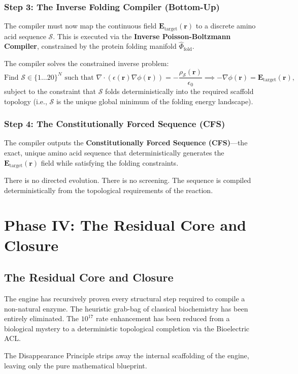 \documentclass[11pt,openany]{extbook}
\theoremstyle{plain}
\theoremstyle{definition}
\begin{document}
\subsubsection{Step 3: The Inverse Folding Compiler (Bottom-Up)}
The compiler must now map the continuous field $\mathbf{E}_{\text{target}}(\mathbf{r})$ to a discrete amino acid sequence $\mathcal{S}$. This is executed via the \textbf{Inverse Poisson-Boltzmann Compiler}, constrained by the protein folding manifold $\hat{\Phi}_{\text{fold}}$.

The compiler solves the constrained inverse problem:
\[
\text{Find } \mathcal{S} \in \{1 \dots 20\}^N \text{ such that } \nabla \cdot (\epsilon(\mathbf{r}) \nabla \phi(\mathbf{r})) = -\frac{\rho_{\mathcal{S}}(\mathbf{r})}{\epsilon_0} \implies -\nabla \phi(\mathbf{r}) = \mathbf{E}_{\text{target}}(\mathbf{r}),
\]
subject to the constraint that $\mathcal{S}$ folds deterministically into the required scaffold topology (i.e., $\mathcal{S}$ is the unique global minimum of the folding energy landscape).

\subsubsection{Step 4: The Constitutionally Forced Sequence (CFS)}
The compiler outputs the \textbf{Constitutionally Forced Sequence (CFS)}---the exact, unique amino acid sequence that deterministically generates the $\mathbf{E}_{\text{target}}(\mathbf{r})$ field while satisfying the folding constraints.

There is no directed evolution. There is no screening. The sequence is compiled deterministically from the topological requirements of the reaction.

\section{Phase IV: The Residual Core and Closure}

\subsection{The Residual Core and Closure}
The engine has recursively proven every structural step required to compile a non-natural enzyme. The heuristic grab-bag of classical biochemistry has been entirely eliminated. The $10^{17}$ rate enhancement has been reduced from a biological mystery to a deterministic topological completion via the Bioelectric ACL.

The Disappearance Principle strips away the internal scaffolding of the engine, leaving only the pure mathematical blueprint.
\end{document}
